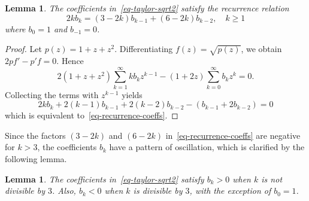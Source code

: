 \documentclass[12pt]{amsart}
\newtheorem{lemma}[theorem]{Lemma}
\theoremstyle{definition}
\theoremstyle{remark}
\numberwithin{equation}{section}
\begin{document}
\begin{lemma}\label{lemma-recurrence-coeffs}
The coefficients in~\eqref{eq-taylor-sqrt2} satisfy the recurrence relation 
\begin{equation}\label{eq-recurrence-coeffs}
2k b_{k}  = (3-2k) b_{k-1} 
+ (6-2k) b_{k-2}, \quad k\ge 1    
\end{equation}
where $b_0=1$ and $b_{-1} = 0$. 
\end{lemma}

\begin{proof} Let $p(z)=1+z+z^2$. Differentiating $f(z)=\sqrt{p(z)}$, we obtain $2pf'-p'f = 0$. Hence 
\[
2(1+z+z^2) \sum_{k=1}^\infty k b_k z^{k-1}
 - (1+2z) \sum_{k=0}^\infty b_k z^k = 0. 
\]
Collecting the terms with $z^{k-1}$ yields
\[
2k b_k + 2(k-1)b_{k-1} + 2(k-2)b_{k-2}
- (b_{k-1} + 2b_{k-2}) = 0
\]
which is equivalent to~\eqref{eq-recurrence-coeffs}. 
\end{proof}

Since the factors $(3-2k)$ and $(6-2k)$ in~\eqref{eq-recurrence-coeffs} are negative for $k>3$, the coefficients $b_k$ have a pattern of oscillation, which is clarified by the following lemma. 

\begin{lemma}\label{lemma-signs-coeffs} The coefficients in~\eqref{eq-taylor-sqrt2} satisfy $b_k>0$ when $k$ is not divisible by $3$. Also, $b_k<0$ when $k$ is divisible by $3$, with the exception of $b_0=1$.
\end{lemma}
\end{document}
